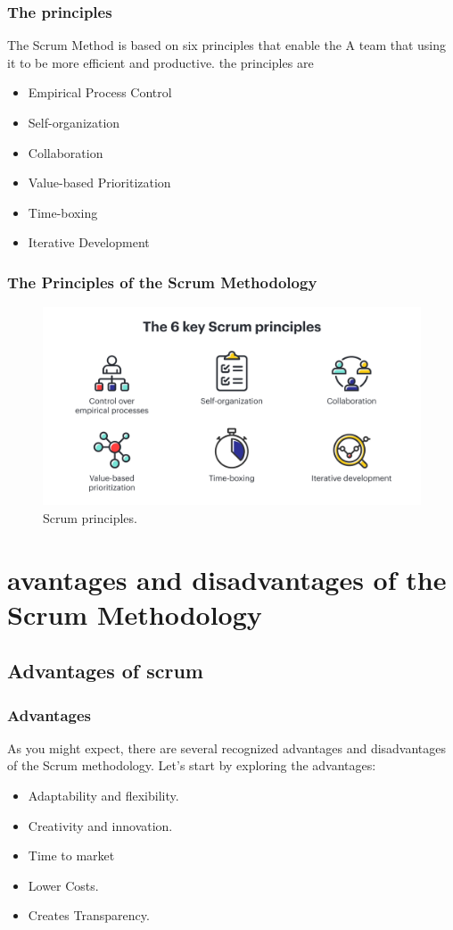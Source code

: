\documentclass[
	11pt, %
]{beamer}
\begin{document}

\begin{frame}
	\frametitle{The principles}
	The Scrum Method is based on six principles that enable the 
	A team that using it to be more efficient and productive.
	the principles are  
	\begin{itemize}
		\item Empirical Process Control
		\item Self-organization
		\item Collaboration
		\item Value-based Prioritization
		\item Time-boxing
		\item Iterative Development
	\end{itemize}
\end{frame}

\begin{frame}
	\frametitle{The Principles of the Scrum Methodology}
	\begin{figure}
		\includegraphics[width=0.8\linewidth]{principles.png}
		\caption{Scrum principles.}
	\end{figure}
\end{frame}

% 



\section{avantages and disadvantages of the Scrum Methodology}
\subsection{Advantages of scrum}
\begin{frame}
	\frametitle{Advantages}
	As you might expect, there are several recognized advantages and disadvantages of the Scrum methodology. Let's start by exploring the advantages:
	\\
	\begin{itemize} 
		\item Adaptability and flexibility.
		\item Creativity and innovation.
		\item Time to market
		\item Lower Costs.
		\item Creates Transparency.
	\end{itemize}
\end{frame}
\end{document}
